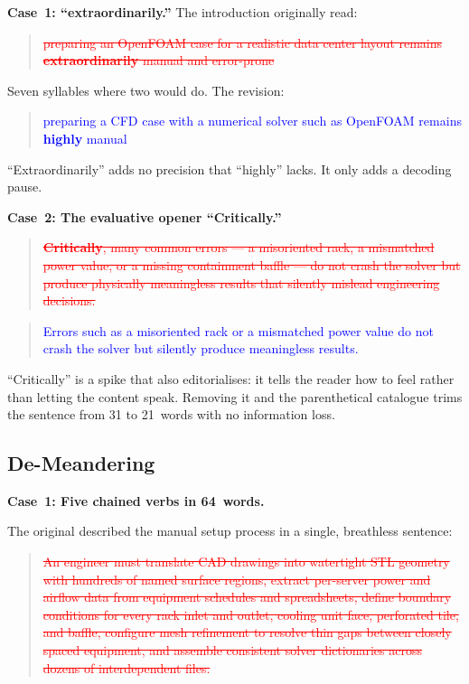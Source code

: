 \documentclass[journal]{IEEEtran}
\newcommand{\revdel}[1]{\textcolor{red}{\sout{#1}}}
\newcommand{\revadd}[1]{\textcolor{blue}{#1}}
\begin{document}
\textbf{Case~1: ``extraordinarily.''}
The introduction originally read:

\begin{quote}
\revdel{preparing an OpenFOAM case for a realistic data center layout remains \textbf{extraordinarily} manual and error-prone}
\end{quote}

\noindent Seven syllables where two would do. The revision:

\begin{quote}
\revadd{preparing a CFD case with a numerical solver such as OpenFOAM remains \textbf{highly} manual}
\end{quote}

\noindent ``Extraordinarily'' adds no precision that ``highly'' lacks. It only adds a decoding pause.

\medskip

\textbf{Case~2: The evaluative opener ``Critically.''}

\begin{quote}
\revdel{\textbf{Critically}, many common errors --- a misoriented rack, a mismatched power value, or a missing containment baffle --- do not crash the solver but produce physically meaningless results that silently mislead engineering decisions.}
\end{quote}

\begin{quote}
\revadd{Errors such as a misoriented rack or a mismatched power value do not crash the solver but silently produce meaningless results.}
\end{quote}

\noindent ``Critically'' is a spike that also editorialises: it tells the reader how to feel rather than letting the content speak. Removing it and the parenthetical catalogue trims the sentence from 31 to 21~words with no information loss.

\subsection{De-Meandering}

\textbf{Case~1: Five chained verbs in 64~words.}

The original described the manual setup process in a single, breathless sentence:

\begin{quote}
\revdel{An engineer must translate CAD drawings into watertight STL geometry with hundreds of named surface regions, extract per-server power and airflow data from equipment schedules and spreadsheets, define boundary conditions for every rack inlet and outlet, cooling unit face, perforated tile, and baffle, configure mesh refinement to resolve thin gaps between closely spaced equipment, and assemble consistent solver dictionaries across dozens of interdependent files.}
\end{quote}
\end{document}
